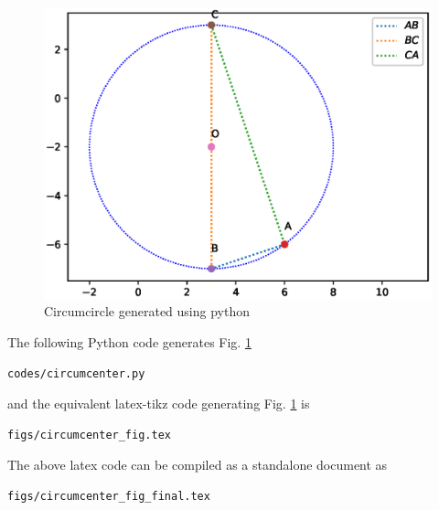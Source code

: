\begin{enumerate}[label=\thesection.\arabic*.,ref=\thesection.\theenumi]
\begin{figure}[!ht]
\centering
\includegraphics[width=\columnwidth]{./figs/circles.eps}
\caption{Circumcircle generated using python}
\label{fig:Circumcircle2}
\end{figure} 

\solution The  following Python code generates Fig. \ref{fig:Circumcircle2}

\begin{lstlisting}
codes/circumcenter.py
\end{lstlisting}

and the equivalent latex-tikz code generating Fig. \ref{fig:Circumcircle2} is 
\begin{lstlisting}
figs/circumcenter_fig.tex
\end{lstlisting}
%
The above latex code can be compiled as a standalone document as
\begin{lstlisting}
figs/circumcenter_fig_final.tex
\end{lstlisting}
\end{enumerate}

